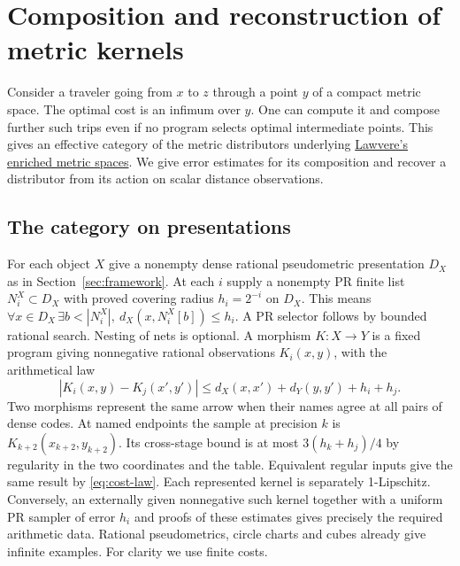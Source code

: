 \section{Composition and reconstruction of metric kernels}\label{sec:category}

Consider a traveler going from \(x\) to \(z\) through a point \(y\) of a compact metric space. The optimal cost is an infimum over \(y\). One can compute it and compose further such trips even if no program selects optimal intermediate points. This gives an effective category of the metric distributors underlying \href{https://www.tac.mta.ca/tac/reprints/articles/1/tr1abs.html}{Lawvere's enriched metric spaces}. We give error estimates for its composition and recover a distributor from its action on scalar distance observations.

\subsection{The category on presentations}

For each object \(X\) give a nonempty dense rational pseudometric presentation \(D_X\) as in Section~\ref{sec:framework}. At each \(i\) supply a nonempty PR finite list \(N^X_i\subset D_X\) with proved covering radius \(h_i=2^{-i}\) on \(D_X\). This means \(\forall x\in D_X\,\exists b<|N^X_i|,\ d_X(x,N^X_i[b])\le h_i\). A PR selector follows by bounded rational search. Nesting of nets is optional. A morphism \(K:X\to Y\) is a fixed program giving nonnegative rational observations \(K_i(x,y)\), with the arithmetical law
\begin{equation}
 |K_i(x,y)-K_j(x',y')|\le d_X(x,x')+d_Y(y,y')+h_i+h_j .
 \label{eq:cost-law}
\end{equation}
Two morphisms represent the same arrow when their names agree at all pairs of dense codes. At named endpoints the sample at precision \(k\) is \(K_{k+2}(x_{k+2},y_{k+2})\). Its cross-stage bound is at most \(3(h_k+h_j)/4\) by regularity in the two coordinates and the table. Equivalent regular inputs give the same result by \eqref{eq:cost-law}. Each represented kernel is separately 1-Lipschitz. Conversely, an externally given nonnegative such kernel together with a uniform PR sampler of error \(h_i\) and proofs of these estimates gives precisely the required arithmetic data. Rational pseudometrics, circle charts and cubes already give infinite examples. For clarity we use finite costs.

